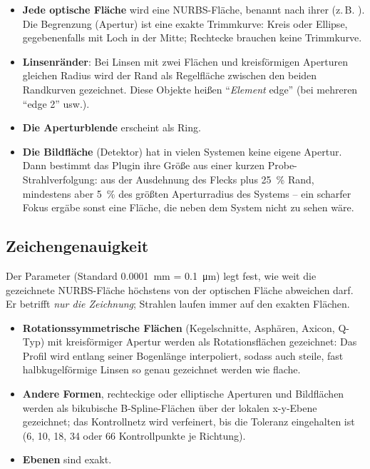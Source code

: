 \begin{itemize}
  \item \textbf{Jede optische Fläche} wird eine NURBS-Fläche, benannt nach ihrer 
    (z.\,B. ). Die Begrenzung (Apertur) ist eine exakte Trimmkurve: Kreis oder Ellipse,
    gegebenenfalls mit Loch in der Mitte; Rechtecke brauchen keine Trimmkurve.
  \item \textbf{Linsenränder}: Bei Linsen mit zwei Flächen und kreisförmigen Aperturen gleichen
    Radius wird der Rand als Regelfläche zwischen den beiden Randkurven gezeichnet. Diese
    Objekte heißen \enquote{\textit{Element} edge} (bei mehreren \enquote{edge 2} usw.).
  \item \textbf{Die Aperturblende} erscheint als Ring.
  \item \textbf{Die Bildfläche} (Detektor) hat in vielen Systemen keine eigene Apertur. Dann
    bestimmt das Plugin ihre Größe aus einer kurzen Probe-Strahlverfolgung: aus der Ausdehnung des
    Flecks plus \SI{25}{\percent} Rand, mindestens aber \SI{5}{\percent} des größten
    Aperturradius des Systems -- ein scharfer Fokus ergäbe sonst eine Fläche, die neben dem
    System nicht zu sehen wäre.
\end{itemize}

\subsection{Zeichengenauigkeit}\label{sec:rt-toleranz}

Der Parameter  (Standard \SI{0.0001}{\milli\metre} =
\SI{0.1}{\micro\metre}) legt fest, wie weit die gezeichnete NURBS-Fläche höchstens von der
optischen Fläche abweichen darf. Er betrifft \emph{nur die Zeichnung}; Strahlen laufen immer
auf den exakten Flächen.

\begin{itemize}
  \item \textbf{Rotationssymmetrische Flächen} (Kegelschnitte, Asphären, Axicon, Q-Typ) mit
    kreisförmiger Apertur werden als Rotationsflächen gezeichnet: Das Profil wird entlang
    seiner Bogenlänge interpoliert, sodass auch steile, fast halbkugelförmige Linsen so genau
    gezeichnet werden wie flache.
  \item \textbf{Andere Formen}, rechteckige oder elliptische Aperturen und Bildflächen werden
    als bikubische B-Spline-Flächen über der lokalen x-y-Ebene gezeichnet; das Kontrollnetz wird
    verfeinert, bis die Toleranz eingehalten ist (6, 10, 18, 34 oder 66 Kontrollpunkte je
    Richtung).
  \item \textbf{Ebenen} sind exakt.
\end{itemize}

